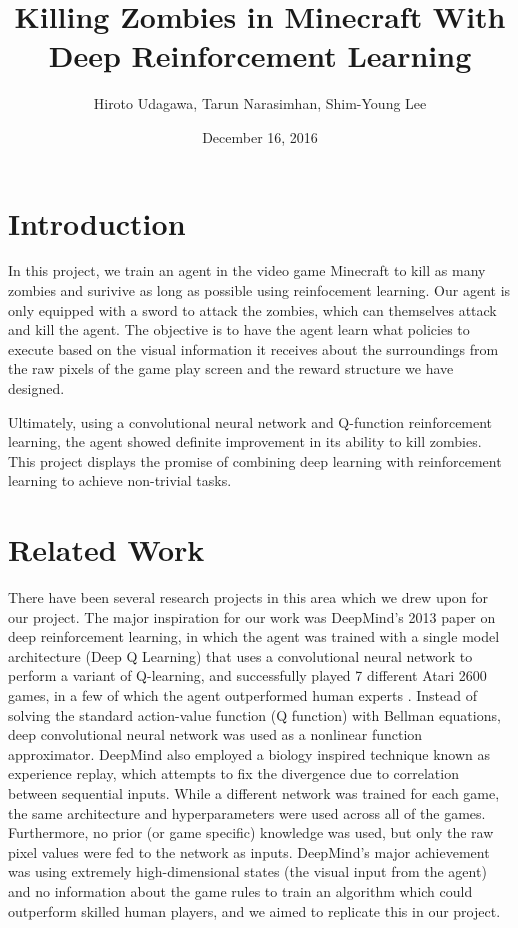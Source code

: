 \documentclass{article}
\title{Killing Zombies in Minecraft With Deep Reinforcement Learning}
\author{Hiroto Udagawa, Tarun Narasimhan, Shim-Young Lee}
\date{December 16, 2016}
\begin{document}
\maketitle

\begin{multicols}{2}

\section{Introduction}

In this project, we train an agent in the video game Minecraft to kill as many zombies and surivive as long as possible using reinfocement learning. Our agent is only equipped with a sword to attack the zombies, which can themselves attack and kill the agent. The objective is to have the agent learn what policies to execute based on the visual information it receives about the surroundings from the raw pixels of the game play screen and the reward structure we have designed.

Ultimately, using a convolutional neural network and Q-function reinforcement learning, the agent showed definite improvement in its ability to kill zombies. This project displays the promise of combining deep learning with reinforcement learning to achieve non-trivial tasks.





\section{Related Work}

There have been several research projects in this area which we drew upon for our project.
The major inspiration for our work was DeepMind's 2013 paper on deep reinforcement learning, in which the agent was trained with a single model architecture (Deep Q Learning) that uses a convolutional neural network to perform a variant of Q-learning, and successfully played 7 different Atari 2600 games, in a few of which the agent outperformed human experts \cite{deepMind}.
Instead of solving the standard action-value function (Q function) with Bellman equations, deep convolutional neural network was used as a nonlinear function approximator. DeepMind also employed a biology inspired technique known as experience replay, which attempts to fix the divergence due to correlation between sequential inputs.
While a different network was trained for each game, the same architecture and hyperparameters were used across all of the games.
Furthermore, no prior (or game specific) knowledge was used, but only the raw pixel values were fed to the network as inputs.
DeepMind's major achievement was using extremely high-dimensional states (the visual input from the agent) and no information about the game rules to train an algorithm which could outperform skilled human players, and we aimed to replicate this in our project.


\end{multicols}
\end{document}
